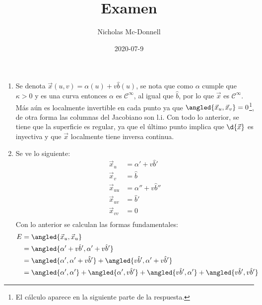 \documentclass{homework}
\title{Examen}
\date{2020-07-9}
\author{Nicholas Mc-Donnell}
\begin{document}
\maketitle
\newpage
{}

\begin{sol}
    \begin{enumerate}
        \item Se denota \(\vec{x}(u,v)=\alpha(u)+v\hat{b}(u)\), se nota que como \(\alpha\) cumple que \(\kappa>0\) y es una curva entonces \(\alpha\) es \(\mathcal{C}^\infty\), al igual que \(\hat{b}\), por lo que \(\vec{x}\) es \(\mathcal{C}^\infty\). Más aún es localmente invertible en cada punto ya que \(\angled{\vec{x}_u,\vec{x}_v}=0\)\footnote{El cálculo aparece en la siguiente parte de la respuesta.}, de otra forma las columnas del Jacobiano son l.i. Con todo lo anterior, se tiene que la superficie es regular, ya que el último punto implica que \(\d{\vec{x}}\) es inyectiva y que \(\vec{x}\) localmente tiene inversa continua.
        \item Se ve lo siguiente:
              \begin{align*}
                  \vec{x}_u    & =\alpha'+v\hat{b}'   \\
                  \vec{x}_v    & =\hat{b}             \\
                  \vec{x}_{uu} & =\alpha''+v\hat{b}'' \\
                  \vec{x}_{uv} & =\hat{b}'            \\
                  \vec{x}_{vv} & =0                   \\
              \end{align*}
              Con lo anterior se calculan las formas fundamentales:
              \begin{align*}
                  E & =\angled{\vec{x}_u,\vec{x}_u}                                                                                                                   \\
                    & =\angled{\alpha'+v\hat{b}',\alpha'+v\hat{b}'}                                                                                                   \\
                    & =\angled{\alpha',\alpha'+v\hat{b}'}+\angled{v\hat{b}',\alpha'+v\hat{b}'}                                                                        \\
                    & =\angled{\alpha',\alpha'}+\angled{\alpha',v\hat{b}'}+\angled{v\hat{b}',\alpha'}+\angled{v\hat{b}',v\hat{b}'}                                    \\

\end{align*}
\end{enumerate}
\end{sol}
\end{document}
